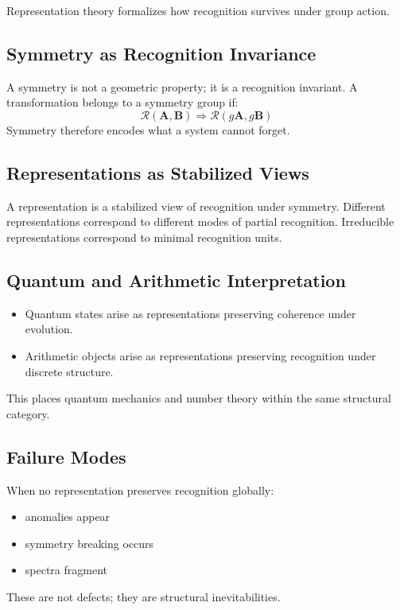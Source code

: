 \documentclass[12pt, oneside]{article}
\newcommand{\R}{\mathcal{R}}
\begin{document}
Representation theory formalizes how recognition survives under group action.

\subsection{Symmetry as Recognition Invariance}

A symmetry is not a geometric property; it is a recognition invariant. A transformation belongs to a symmetry group if:
\begin{equation}
\R(\mathbf{A},\mathbf{B}) \Rightarrow \R(g\mathbf{A},g\mathbf{B})
\end{equation}
Symmetry therefore encodes what a system cannot forget.

\subsection{Representations as Stabilized Views}

A representation is a stabilized view of recognition under symmetry. Different representations correspond to different modes of partial recognition. Irreducible representations correspond to minimal recognition units.

\subsection{Quantum and Arithmetic Interpretation}

\begin{itemize}
    \item Quantum states arise as representations preserving coherence under evolution.
    \item Arithmetic objects arise as representations preserving recognition under discrete structure.
\end{itemize}
This places quantum mechanics and number theory within the same structural category.

\subsection{Failure Modes}

When no representation preserves recognition globally:
\begin{itemize}
    \item anomalies appear
    \item symmetry breaking occurs
    \item spectra fragment
\end{itemize}
These are not defects; they are structural inevitabilities.
\end{document}
